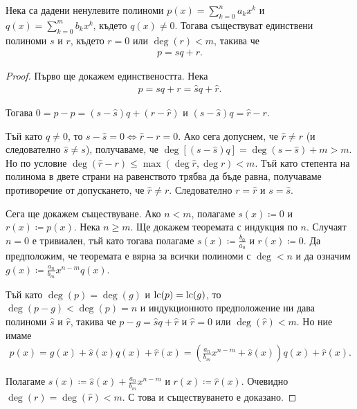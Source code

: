 \documentclass[numbers=endperiod, bibliography=totocnumbered]{scrartcl}
\begin{document}
\begin{theorem}
  Нека са дадени ненулевите полиноми \( p(x) = \sum_{k=0}^n a_k x^k \) и \( q(x) = \sum_{k=0}^m b_k x^k \), където \( q(x) \neq 0 \). Тогава съществуват единствени полиноми \( s \) и \( r \), където \( r = 0 \) или \( \deg(r) < m \), такива че
  \begin{align*}
    p = sq + r.
  \end{align*}
\end{theorem}
\begin{proof}
  Първо ще докажем единствеността. Нека
  \begin{align*}
    p = sq + r = \hat sq + \hat r.
  \end{align*}

  Тогава \( 0 = p - p = (s - \hat s) q + (r - \hat r) \) и \( (s - \hat s) q = \hat r - r \).

  Тъй като \( q \neq 0 \), то \( s - \hat s = 0 \iff \hat r - r = 0 \). Ако сега допуснем, че \( \hat r \neq r \) (и следователно \( \hat s \neq s \)), получаваме, че \( \deg[(s - \hat s) q] = \deg(s - \hat s) + m > m \). Но по условие \( \deg(\hat r - r) \leq \max(\deg \hat r, \deg r) < m \). Тъй като степента на полинома в двете страни на равенството трябва да бъде равна, получаваме противоречие от допускането, че \( \hat r \neq r \). Следователно \( r = \hat r \) и \( s = \hat s \).

  Сега ще докажем съществуване. Ако \( n < m \), полагаме \( s(x) \coloneqq 0 \) и \( r(x) \coloneqq p(x) \). Нека \( n \geq m \). Ще докажем теоремата с индукция по \( n \). Случаят \( n = 0 \) е тривиален, тъй като тогава полагаме \( s(x) \coloneqq \frac {b_0} {a_0} \) и \( r(x) \coloneqq 0 \). Да предположим, че теоремата е вярна за всички полиноми с \( \deg < n \) и да означим \( g(x) \coloneqq \frac {a_n} {b_m} x^{n-m} q(x) \).

  Тъй като \( \deg(p) = \deg(g) \) и \( \operatorname{lc}(p) = \operatorname{lc}(g) \), то \( \deg(p - g) < \deg(p) = n \) и индукционното предположение ни дава полиноми \( \hat s \) и \( \hat r \), такива че \( p - g = \hat s q + \hat r \) и \( \hat r = 0 \) или \( \deg(\hat r) < m \). Но ние имаме
  \begin{align*}
    p(x)
    =
    g(x) + \hat s(x) q(x) + \hat r(x)
    =
    \left( \frac {a_n} {b_m} x^{n-m} + \hat s(x) \right) q(x) + \hat r(x).
  \end{align*}

  Полагаме \( s(x) \coloneqq \hat s(x) + \frac {a_n} {b_m} x^{n-m} \) и \( r(x) \coloneqq \hat r(x) \). Очевидно \( \deg(r) = \deg(\hat r) < m \). С това и съществуването е доказано.
\end{proof}
\end{document}
